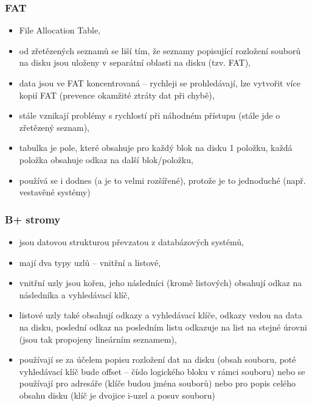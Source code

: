 \documentclass[a4paper, 11pt]{article}
\begin{document}
\subsubsection{FAT}
\begin{itemize}
    \item File Allocation Table,
    \item od zřetězených seznamů se liší tím, že seznamy popisující rozložení souborů na disku jsou uloženy v separátní oblasti na disku (tzv. FAT),
    \item data jsou ve FAT koncentrovaná -- rychleji se prohledávají, lze vytvořit více kopií FAT (prevence okamžité ztráty dat při chybě),
    \item stále vznikají problémy s rychlostí při náhodném přístupu (stále jde o zřetězený seznam),
    \item tabulka je pole, které obsahuje pro každý blok na disku 1 položku, každá položka obsahuje odkaz na další blok/položku,
    \item používá se i dodnes (a je to velmi rozšířené), protože je to jednoduché (např. vestavěné systémy)
\end{itemize}

\newpage

\subsubsection{B+ stromy}
\begin{itemize}
    \item jsou datovou strukturou převzatou z databázových systémů,
    \item mají dva typy uzlů -- vnitřní a listové,
    \item vnitřní uzly jsou kořen, jeho následníci (kromě listových) obsahují odkaz na následníka a vyhledávací klíč,
    \item listové uzly také obsahují odkazy a vyhledávací klíče, odkazy vedou na data na disku, poslední odkaz na posledním listu odkazuje na list na stejné úrovni (jsou tak propojeny lineárním seznamem),
    \item používají se za účelem popisu rozložení dat na disku (obsah souboru, poté vyhledávací klíč bude offset -- číslo logického bloku v rámci souboru) nebo se používají pro adresáře (klíče budou jména souborů) nebo pro popis celého obsahu disku (klíč je dvojice i-uzel a posuv souboru)
\end{itemize}
 
\end{document}
